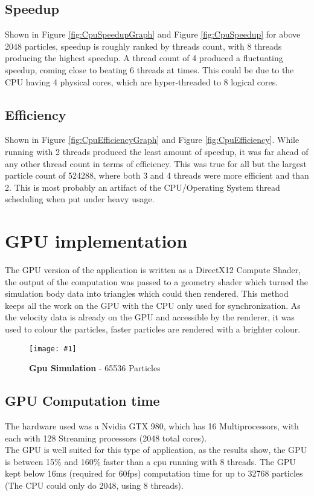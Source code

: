 \documentclass[conference]{acmsiggraph}
\newcommand{\figuremacroW}[4]{
	\begin{figure}[h] %
		\centering
		\texttt{[image: \#1]}
		\caption[#2]{\textbf{#2} - #3}
		\label{fig:#1}
	\end{figure}
}
\begin{document}
\subsection{Speedup}
Shown in Figure \ref{fig:CpuSpeedupGraph} and Figure \ref{fig:CpuSpeedup}
for above 2048 particles, speedup is roughly ranked by threads count, with 8 threads producing the highest speedup. A thread count of 4 produced a fluctuating speedup, coming close to beating 6 threads at times. This could be due to the CPU having 4 physical cores, which are hyper-threaded to 8 logical cores.

\subsection{Efficiency}
Shown in Figure \ref{fig:CpuEfficiencyGraph} and Figure \ref{fig:CpuEfficiency}.
While running with 2 threads produced the least amount of speedup, it was far ahead of any other thread count in terms of efficiency. This was true for all but the largest particle count of 524288, where both 3 and 4 threads were more efficient and than 2. This is most probably an artifact of the CPU/Operating System thread scheduling when put under heavy usage.

\section{GPU implementation}
The GPU version of the application is written as a DirectX12 Compute Shader, the output of the computation was passed to a geometry shader which turned the simulation body data into triangles which could then rendered. This method keeps all the work on the GPU with the CPU only used for synchronization. 
As the velocity data is already on the GPU and accessible by the renderer, it was used to colour the particles, faster particles are rendered with a brighter colour.

\figuremacroW
{gpusim2}
{Gpu Simulation}
{65536 Particles}
{1.0}

\subsection{GPU Computation time}
The hardware used was a Nvidia GTX 980, which has 16 Multiprocessors, with each with 128 Streaming processors (2048 total cores).\\
The GPU is well suited for this type of application, as the results show, the GPU is between 15\% and 160\% faster than a cpu running with 8 threads. The GPU kept below 16ms (required for 60fps) computation time for up to 32768 particles (The CPU could only do 2048, using 8 threads).
\end{document}
